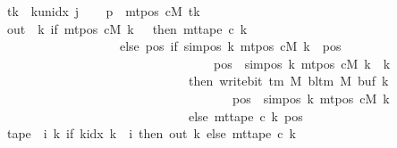 \begin{isabellebody}
\ {\isacharquery}{\kern0pt}tk\ {\isacharequal}{\kern0pt}\ {\isachardoublequoteopen}k{\isacharunderscore}{\kern0pt}unidx\ j{\isachardoublequoteclose}\isanewline
\ \ \isamarkupfalse%
\ {\isacharquery}{\kern0pt}p\ {\isacharequal}{\kern0pt}\ {\isachardoublequoteopen}mt{\isacharunderscore}{\kern0pt}pos\ cM\ {\isacharquery}{\kern0pt}tk{\isachardoublequoteclose}\isanewline
\ \ \isamarkupfalse%
\ {\isacharquery}{\kern0pt}out\ {\isacharequal}{\kern0pt}\ {\isachardoublequoteopen}{\isasymlambda}k{\isachardot}{\kern0pt}\ if\ mt{\isacharunderscore}{\kern0pt}pos\ cM\ k\ {\isacharequal}{\kern0pt}\ {}\ then\ mt{\isacharunderscore}{\kern0pt}tape\ c{}\ k\isanewline
\ \ \ \ \ \ \ \ \ \ \ \ \ \ \ \ \ \ \ else\ {\isacharparenleft}{\kern0pt}{\isasymlambda}pos{\isachardot}{\kern0pt}\ if\ sim{\isacharunderscore}{\kern0pt}pos\ {\isacharquery}{\kern0pt}k\ {\isacharparenleft}{\kern0pt}mt{\isacharunderscore}{\kern0pt}pos\ cM\ k{\isacharparenright}{\kern0pt}\ {\isasymle}\ pos\isanewline
\ \ \ \ \ \ \ \ \ \ \ \ \ \ \ \ \ \ \ \ \ \ \ \ \ \ \ \ \ \ \ \ \ {\isasymand}\ pos\ {\isacharless}{\kern0pt}\ sim{\isacharunderscore}{\kern0pt}pos\ {\isacharquery}{\kern0pt}k\ {\isacharparenleft}{\kern0pt}mt{\isacharunderscore}{\kern0pt}pos\ cM\ k{\isacharparenright}{\kern0pt}\ {\isacharplus}{\kern0pt}\ {\isacharquery}{\kern0pt}k\isanewline
\ \ \ \ \ \ \ \ \ \ \ \ \ \ \ \ \ \ \ \ \ \ \ \ \ \ \ \ \ \ then\ write{\isacharunderscore}{\kern0pt}bit\ {\isacharparenleft}{\kern0pt}{\isasymGamma}{\isacharunderscore}{\kern0pt}tm\ M{\isacharparenright}{\kern0pt}\ {\isacharparenleft}{\kern0pt}bl{\isacharunderscore}{\kern0pt}tm\ M{\isacharparenright}{\kern0pt}\ {\isacharparenleft}{\kern0pt}buf\ k{\isacharparenright}{\kern0pt}\isanewline
\ \ \ \ \ \ \ \ \ \ \ \ \ \ \ \ \ \ \ \ \ \ \ \ \ \ \ \ \ \ \ \ \ \ \ \ \ {\isacharparenleft}{\kern0pt}pos\ {\isacharminus}{\kern0pt}\ sim{\isacharunderscore}{\kern0pt}pos\ {\isacharquery}{\kern0pt}k\ {\isacharparenleft}{\kern0pt}mt{\isacharunderscore}{\kern0pt}pos\ cM\ k{\isacharparenright}{\kern0pt}{\isacharparenright}{\kern0pt}\isanewline
\ \ \ \ \ \ \ \ \ \ \ \ \ \ \ \ \ \ \ \ \ \ \ \ \ \ \ \ \ \ else\ mt{\isacharunderscore}{\kern0pt}tape\ c{}\ k\ pos{\isacharparenright}{\kern0pt}{\isachardoublequoteclose}\isanewline
\ \ \isamarkupfalse%
\ {\isacharquery}{\kern0pt}tape\ {\isacharequal}{\kern0pt}\ {\isachardoublequoteopen}{\isasymlambda}i{\isachardot}{\kern0pt}\ {\isacharparenleft}{\kern0pt}{\isasymlambda}k{\isachardot}{\kern0pt}\ if\ k{\isacharunderscore}{\kern0pt}idx\ k\ {\isacharless}{\kern0pt}\ i\ then\ {\isacharquery}{\kern0pt}out\ k\ else\ mt{\isacharunderscore}{\kern0pt}tape\ c{}\ k{\isacharparenright}{\kern0pt}{\isachardoublequoteclose}\isanewline

\end{isabellebody}
